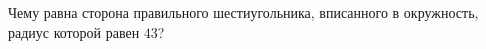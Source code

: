 \begin{ex}
	\begin{condition}
		Чему равна сторона правильного шестиугольника, вписанного в окружность, радиус которой равен \( 43 \)?
	\end{condition}
\end{ex}